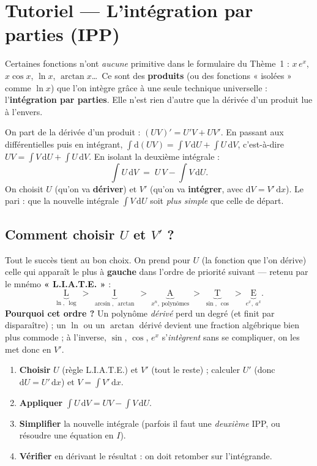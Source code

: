 \documentclass[11pt,a4paper]{article}
\newcommand{\dd}{\mathrm{d}}
\begin{document}
\section*{Tutoriel — L'intégration par parties (IPP)}

Certaines fonctions n'ont \emph{aucune} primitive dans le formulaire du Thème~1 :
$x\,e^x$, $x\cos x$, $\ln x$, $\arctan x$\dots\ Ce sont des \textbf{produits} (ou des fonctions
« isolées » comme $\ln x$) que l'on intègre grâce à une seule technique universelle :
l'\textbf{intégration par parties}. Elle n'est rien d'autre que la dérivée d'un produit lue à l'envers.

\begin{idee}
On part de la dérivée d'un produit : $(UV)'=U'V+UV'$. En passant aux différentielles puis en
intégrant, $\displaystyle\int \dd(UV)=\int V\,\dd U+\int U\,\dd V$, c'est-à-dire $UV=\int V\,\dd U+\int U\,\dd V$.
En isolant la deuxième intégrale :
\[
\boxed{\;\int U\,\dd V \;=\; U\,V-\int V\,\dd U.\;}
\]
On choisit $U$ (qu'on va \textbf{dériver}) et $V'$ (qu'on va \textbf{intégrer}, avec $\dd V=V'\,\dd x$).
Le pari : que la nouvelle intégrale $\int V\,\dd U$ soit \emph{plus simple} que celle de départ.
\end{idee}

\subsection*{Comment choisir $U$ et $V'$ ?}

Tout le succès tient au bon choix. On prend pour $U$ (la fonction que l'on dérive) celle qui apparaît
le plus à \textbf{gauche} dans l'ordre de priorité suivant — retenu par le mnémo \textbf{« L.I.A.T.E. »} :
\[
\underbrace{\text{L}}_{\ln,\ \log}\ >\
\underbrace{\text{I}}_{\arcsin,\ \arctan}\ >\
\underbrace{\text{A}}_{x^n,\ \text{polynômes}}\ >\
\underbrace{\text{T}}_{\sin,\ \cos}\ >\
\underbrace{\text{E}}_{e^x,\ a^x}.
\]
\textbf{Pourquoi cet ordre ?} Un polynôme \emph{dérivé} perd un degré (et finit par disparaître) ; un
$\ln$ ou un $\arctan$ dérivé devient une fraction algébrique bien plus commode ; à l'inverse, $\sin$,
$\cos$, $e^x$ s'\emph{intègrent} sans se compliquer, on les met donc en $V'$.

\begin{methode}[dérouler une IPP en 4 gestes]
\begin{enumerate}[leftmargin=1.8em,topsep=2pt,itemsep=1pt]
  \item \textbf{Choisir} $U$ (règle L.I.A.T.E.) et $V'$ (tout le reste) ; calculer $U'$ (donc $\dd U=U'\,\dd x$) et $V=\int V'\,\dd x$.
  \item \textbf{Appliquer} $\displaystyle\int U\,\dd V=UV-\int V\,\dd U$.
  \item \textbf{Simplifier} la nouvelle intégrale (parfois il faut une \emph{deuxième} IPP, ou résoudre une équation en $I$).
  \item \textbf{Vérifier} en dérivant le résultat : on doit retomber sur l'intégrande.
\end{enumerate}
\end{methode}
\end{document}
